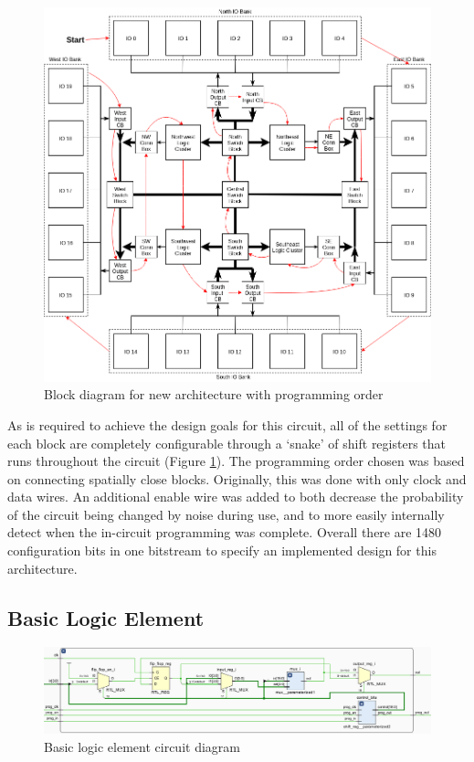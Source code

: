 \documentclass[12pt]{article}
\begin{document}
\begin{figure}[htb]
  \centering
  \includegraphics[width=.6\textwidth]{prog_diag}
  \caption{Block diagram for new architecture with programming order}
  \label{fig:prog_diag}
\end{figure}

As is required to achieve the design goals for this circuit, all of the settings for
each block are completely configurable through a ‘snake’ of shift registers that runs throughout 
the circuit (Figure \ref{fig:prog_diag}). The programming order chosen was based on connecting
spatially close blocks. Originally, this was done with only clock and data
wires. An additional enable wire was added to both decrease the probability of the circuit
being changed by noise during use, and to more easily internally detect when the
in-circuit programming was complete. Overall there are 1480 configuration bits in one 
bitstream to specify an implemented design for this architecture.

\subsection{Basic Logic Element}

\begin{figure}[ht]
    \centering
    \includegraphics[width=\textwidth]{ble}
    \caption{Basic logic element circuit diagram}
    \label{fig:ble}
\end{figure}
\end{document}
